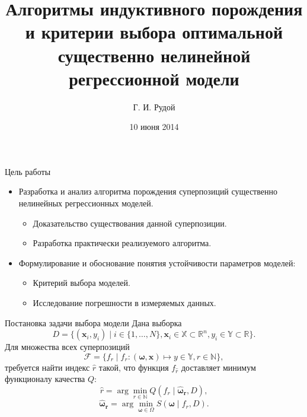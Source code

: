 \documentclass{beamer}
\begin{document}
\title[Порождение и выбор моделей\hspace{4em}\insertframenumber/\inserttotalframenumber]{Алгоритмы индуктивного порождения и критерии выбора оптимальной существенно нелинейной регрессионной модели}
\author{Г. И. Рудой}
\date{10 июня 2014}

\begin{frame}
  \maketitle
\end{frame}

\begin{frame}{Цель работы}
  \begin{itemize}
  	\item Разработка и анализ алгоритма порождения суперпозиций существенно нелинейных регрессионных моделей.
	  \begin{itemize}
		\item Доказательство существования данной суперпозиции.
		\item Разработка практически реализуемого алгоритма.
	  \end{itemize}
	\item Формулирование и обоснование понятия устойчивости параметров моделей:
	\begin{itemize}
	  \item Критерий выбора моделей.
	  \item Исследование погрешности в измеряемых данных.
	\end{itemize}
  \end{itemize}
\end{frame}

\begin{frame}{Постановка задачи выбора модели}
  Дана выборка
  \[
  D = \{ (\mathbf{x}_i, y_i) \mid i \in \{1, \dots, N\},
			  \mathbf{x}_i \in \mathbb{X} \subset \mathbb{R}^n,
			  y_i \in \mathbb{Y} \subset \mathbb{R} \}.
  \]
  Для множества всех суперпозиций
  \[
  \mathcal{F} = \{ f_r \mid
			  f_r : (\boldsymbol{\omega}, \mathbf{x}) \mapsto y \in \mathbb{Y},
			  r \in \mathbb{N} \},
  \]
  требуется найти индекс $\hat{r}$ такой, что функция $f_{\hat{r}}$ доставляет
  минимум функционалу качества $Q$:
  \[
  \hat{r} = \arg \min_{r \in \mathbb{N}} Q (f_r \mid \boldsymbol{\hat{\omega}_r}, D),
  \]
  \[
  \boldsymbol{\hat{\omega}_r} = \arg \min_{\boldsymbol{\omega} \in \Omega} S(\boldsymbol{\omega} \mid f_r, D).
  \]
\end{frame}
\end{document}
